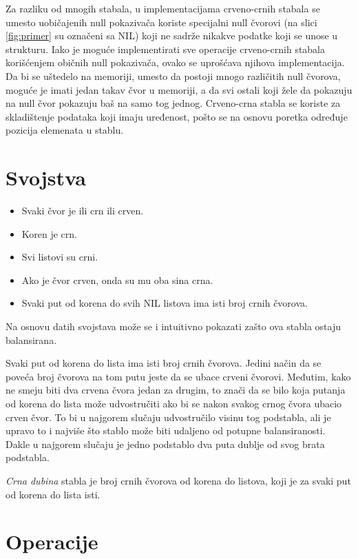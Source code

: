 \documentclass[a4paper]{article}
\begin{document}
Za razliku od mnogih stabala, u implementacijama crveno-crnih stabala se umesto uobičajenih null pokazivača koriste specijalni null čvorovi (na slici \ref{fig:primer} su označeni sa NIL) koji ne sadrže nikakve podatke
koji se unose u strukturu. Iako je moguće implementirati sve operacije crveno-crnih stabala korišćenjem običnih null pokazivača, ovako se uprošćava njihova implementacija.
Da bi se uštedelo na memoriji, umesto da postoji mnogo različitih null čvorova, moguće je imati jedan takav čvor u memoriji, a da svi ostali koji žele da pokazuju na null čvor pokazuju
baš na samo tog jednog.
Crveno-crna stabla se koriste za skladištenje podataka koji imaju uređenost, pošto se na osnovu poretka određuje pozicija elemenata u stablu.
\section{Svojstva}
\label{sec:svojstva}

\begin{itemize}
        \item Svaki čvor je ili crn ili crven.
        \item Koren je crn.
        \item Svi listovi su crni.
        \item Ako je čvor crven, onda su mu oba sina crna.
        \item Svaki put od korena do svih NIL listova ima isti broj crnih čvorova.
\end{itemize}

Na osnovu datih svojstava može se i intuitivno pokazati zašto ova stabla ostaju balansirana.

Svaki put od korena do lista ima isti broj crnih čvorova. Jedini način da se poveća broj čvorova na 
tom putu jeste da se ubace crveni čvorovi. Međutim, kako ne smeju biti dva crvena čvora jedan za drugim,
to znači da se bilo koja putanja od korena do lista može udvostručiti ako bi se nakon svakog crnog čvora
ubacio crven čvor. To bi u najgorem slučaju udvostručilo visinu tog podstabla, ali je upravo to i najviše
što stablo može biti udaljeno od potupne balansiranosti. Dakle u najgorem slučaju je jedno podstablo dva puta
dublje od svog brata podstabla.

\textit{Crna dubina} stabla je broj crnih čvorova od korena do listova, koji je za svaki put od korena do lista isti.

\section{Operacije}
\end{document}
